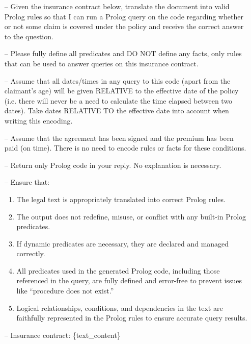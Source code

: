 \begin{itemize}
    \item [--] Given the insurance contract below, translate the document into valid Prolog rules so that I can run a Prolog query on the code regarding whether or not some claim is covered under the policy and receive the correct answer to the question.

    \item [--] Please fully define all predicates and DO NOT define any facts, only rules that can be used to answer queries on this insurance contract.

    \item [--] Assume that all dates/times in any query to this code (apart from the claimant's age) will be given RELATIVE to the effective date of the policy (i.e. there will never be a need to calculate the time elapsed between two dates). Take dates RELATIVE TO the effective date into account when writing this encoding.

    \item [--] Assume that the agreement has been signed and the premium has been paid (on time). There is no need to encode rules or facts for these conditions.

    \item [--] Return only Prolog code in your reply. No explanation is necessary.

    \item [--] Ensure that:
        \begin{enumerate}
            \item The legal text is appropriately translated into correct Prolog rules.
            \item The output does not redefine, misuse, or conflict with any built-in Prolog predicates.
            \item If dynamic predicates are necessary, they are declared and managed correctly.
            \item All predicates used in the generated Prolog code, including those referenced in the query, are fully defined and error-free to prevent issues like ``procedure does not exist.''
            \item Logical relationships, conditions, and dependencies in the text are faithfully represented in the Prolog rules to ensure accurate query results.
        \end{enumerate}
    \item [--] Insurance contract: \{text\_content\}
\end{itemize}

